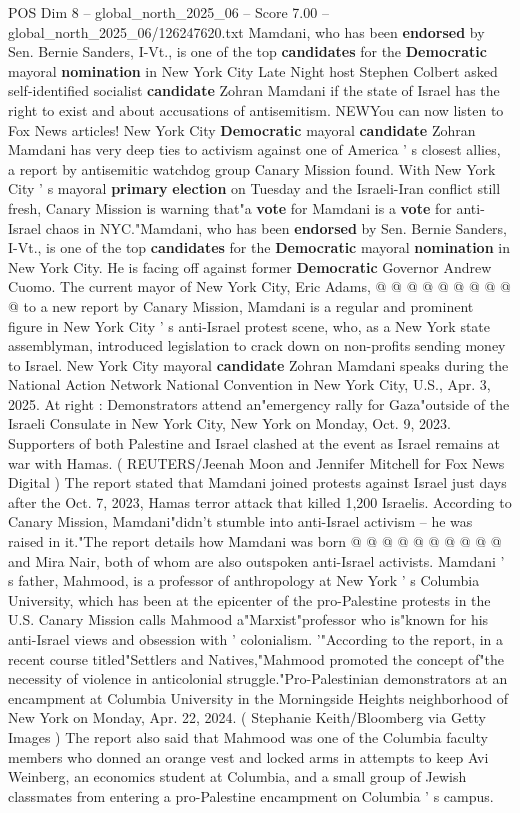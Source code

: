 \begin{textsample}{POS Dim 8 – global\_north\_2025\_06 – Score 7.00 – global\_north\_2025\_06/126247620.txt}  \label{ex:f8_pos_431}
Mamdani, who has been \textbf{endorsed} by Sen.
Bernie Sanders, I-Vt., is one of the top \textbf{candidates} for the \textbf{Democratic} mayoral \textbf{nomination} in New York City Late Night host Stephen Colbert asked self-identified socialist \textbf{candidate} Zohran Mamdani if the state of Israel has the right to exist and about accusations of antisemitism.
NEWYou can now listen to Fox News articles!
New York City \textbf{Democratic} mayoral \textbf{candidate} Zohran Mamdani has very deep ties to activism against one of America ' s closest allies, a report by antisemitic watchdog group Canary Mission found.
With New York City ' s mayoral \textbf{primary} \textbf{election} on Tuesday and the Israeli-Iran conflict still fresh, Canary Mission is warning that"a \textbf{vote} for Mamdani is a \textbf{vote} for anti-Israel chaos in NYC."Mamdani, who has been \textbf{endorsed} by Sen.
Bernie Sanders, I-Vt., is one of the top \textbf{candidates} for the \textbf{Democratic} mayoral \textbf{nomination} in New York City.
He is facing off against former \textbf{Democratic} Governor Andrew Cuomo.
The current mayor of New York City, Eric Adams, @ @ @ @ @ @ @ @ @ @ to a new report by Canary Mission, Mamdani is a regular and prominent figure in New York City ' s anti-Israel protest scene, who, as a New York state assemblyman, introduced legislation to crack down on non-profits sending money to Israel.
New York City mayoral \textbf{candidate} Zohran Mamdani speaks during the National Action Network National Convention in New York City, U.S., Apr. 3, 2025.
At right : Demonstrators attend an"emergency rally for Gaza"outside of the Israeli Consulate in New York City, New York on Monday, Oct. 9, 2023.
Supporters of both Palestine and Israel clashed at the event as Israel remains at war with Hamas. ( REUTERS/Jeenah Moon and Jennifer Mitchell for Fox News Digital ) The report stated that Mamdani joined protests against Israel just days after the Oct. 7, 2023, Hamas terror attack that killed 1,200 Israelis.
According to Canary Mission, Mamdani"didn't stumble into anti-Israel activism -- he was raised in it."The report details how Mamdani was born @ @ @ @ @ @ @ @ @ @ and Mira Nair, both of whom are also outspoken anti-Israel activists.
Mamdani ' s father, Mahmood, is a professor of anthropology at New York ' s Columbia University, which has been at the epicenter of the pro-Palestine protests in the U.S.
Canary Mission calls Mahmood a"Marxist"professor who is"known for his anti-Israel views and obsession with ' colonialism. '"According to the report, in a recent course titled"Settlers and Natives,"Mahmood promoted the concept of"the necessity of violence in anticolonial struggle."Pro-Palestinian demonstrators at an encampment at Columbia University in the Morningside Heights neighborhood of New York on Monday, Apr. 22, 2024. ( Stephanie Keith/Bloomberg via Getty Images ) The report also said that Mahmood was one of the Columbia faculty members who donned an orange vest and locked arms in attempts to keep Avi Weinberg, an economics student at Columbia, and a small group of Jewish classmates from entering a pro-Palestine encampment on Columbia ' s campus.

\end{textsample}
